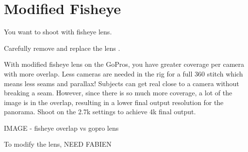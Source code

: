 \chapter{Modified Fisheye}
\pagecolor{white}
\label{chap:26}
\begin{fullwidth}

\problem

{\large You want to shoot with fisheye lens.  \par}


\solution

{\large Carefully remove and replace the lens .  
 \par}

With modified fisheye lens on the GoPros, you have greater coverage per camera with more overlap. Less cameras are needed in the rig for a full 360 stitch which means less seams and parallax! Subjects can get real close to a camera without breaking a seam. However, since there is so much more coverage, a lot of the image is in the overlap, resulting in a lower final output resolution for the panorama. Shoot on the 2.7k settings to achieve 4k final output. 

IMAGE - fisheye overlap vs gopro lens

To modify the lens, NEED FABIEN




\clearpage
\end{fullwidth}

